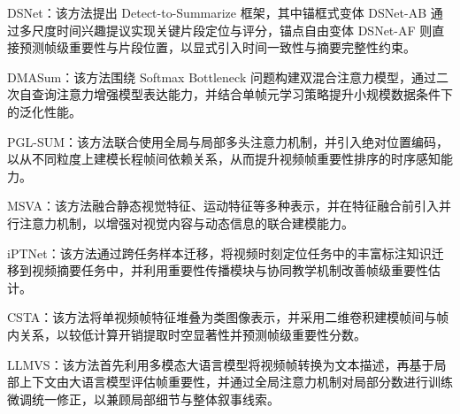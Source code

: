 DSNet\cite{zhu2020dsnet}：该方法提出 Detect-to-Summarize 框架，其中锚框式变体 DSNet-AB 通过多尺度时间兴趣提议实现关键片段定位与评分，锚点自由变体 DSNet-AF 则直接预测帧级重要性与片段位置，以显式引入时间一致性与摘要完整性约束。

DMASum\cite{wang2020query}：该方法围绕 Softmax Bottleneck 问题构建双混合注意力模型，通过二次自查询注意力增强模型表达能力，并结合单帧元学习策略提升小规模数据条件下的泛化性能。

PGL-SUM\cite{apostolidis2021combining}：该方法联合使用全局与局部多头注意力机制，并引入绝对位置编码，以从不同粒度上建模长程帧间依赖关系，从而提升视频帧重要性排序的时序感知能力。

MSVA\cite{ghauri2021supervised}：该方法融合静态视觉特征、运动特征等多种表示，并在特征融合前引入并行注意力机制，以增强对视觉内容与动态信息的联合建模能力。

iPTNet\cite{jiang2022joint}：该方法通过跨任务样本迁移，将视频时刻定位任务中的丰富标注知识迁移到视频摘要任务中，并利用重要性传播模块与协同教学机制改善帧级重要性估计。

CSTA\cite{son2024csta}：该方法将单视频帧特征堆叠为类图像表示，并采用二维卷积建模帧间与帧内关系，以较低计算开销提取时空显著性并预测帧级重要性分数。

LLMVS\cite{lee2025video}：该方法首先利用多模态大语言模型将视频帧转换为文本描述，再基于局部上下文由大语言模型评估帧重要性，并通过全局注意力机制对局部分数进行训练微调统一修正，以兼顾局部细节与整体叙事线索。

